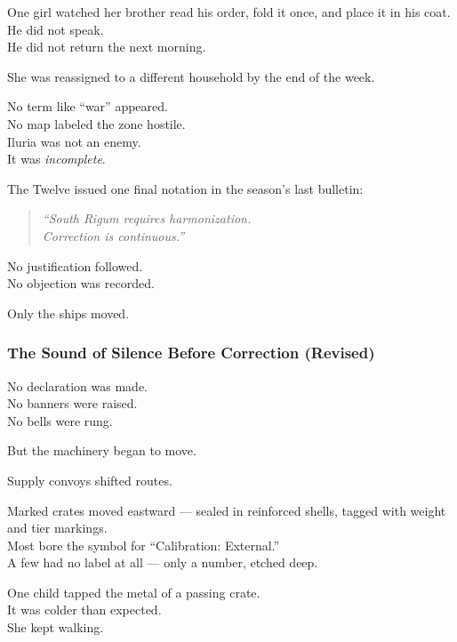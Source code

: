 \documentclass[12pt]{article}
\begin{document}
\vspace{1em}

One girl watched her brother read his order, fold it once, and place it in his coat.\\
He did not speak.\\
He did not return the next morning.

She was reassigned to a different household by the end of the week.

\vspace{1em}

No term like “war” appeared.\\
No map labeled the zone hostile.\\
Iluria was not an enemy.\\
It was \textit{incomplete}.

\vspace{1em}

The Twelve issued one final notation in the season’s last bulletin:

\begin{quote}
\textit{“South Rigum requires harmonization.}\\
\textit{Correction is continuous.”}
\end{quote}

No justification followed.\\
No objection was recorded.

Only the ships moved.

\dotfill

\subsubsection{The Sound of Silence Before Correction (Revised)}

No declaration was made.\\
No banners were raised.\\
No bells were rung.

But the machinery began to move.

\vspace{1em}

Supply convoys shifted routes.

Marked crates moved eastward — sealed in reinforced shells, tagged with weight and tier markings.\\
Most bore the symbol for “Calibration: External.”\\
A few had no label at all — only a number, etched deep.

One child tapped the metal of a passing crate.\\
It was colder than expected.\\
She kept walking.
\end{document}
